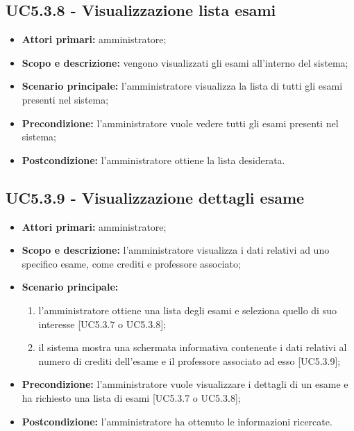\documentclass[AnalisiDeiRequisiti.tex]{subfiles}
\begin{document}
\subsection{UC5.3.8 - Visualizzazione lista esami}
\begin{itemize}
	\item \textbf{Attori primari:} amministratore;
	\item \textbf{Scopo e descrizione:} vengono visualizzati gli esami all'interno del sistema;
	\item \textbf{Scenario principale:} l'amministratore visualizza la lista di tutti gli esami presenti nel sistema;
	\item \textbf{Precondizione:} l'amministratore vuole vedere tutti gli esami presenti nel sistema; 
	\item \textbf{Postcondizione:} l'amministratore ottiene la lista desiderata.
\end{itemize}

\subsection{UC5.3.9 - Visualizzazione dettagli esame}
\begin{itemize}
	\item \textbf{Attori primari:} amministratore;
	\item \textbf{Scopo e descrizione:} l'amministratore visualizza i dati relativi ad uno specifico esame, come crediti e professore associato;
	\item \textbf{Scenario principale:}
	\begin{enumerate}
		\item l'amministratore ottiene una lista degli esami e seleziona quello di suo interesse [UC5.3.7 o UC5.3.8];
		\item il sistema mostra una schermata informativa contenente i dati relativi al numero di crediti dell'esame e il professore associato ad esso [UC5.3.9];
	\end{enumerate}
	\item \textbf{Precondizione:} l'amministratore vuole visualizzare i dettagli di un esame e ha richiesto una lista di esami [UC5.3.7 o UC5.3.8]; 
	\item \textbf{Postcondizione:} l'amministratore ha ottenuto le informazioni ricercate.
\end{itemize}
\end{document}
